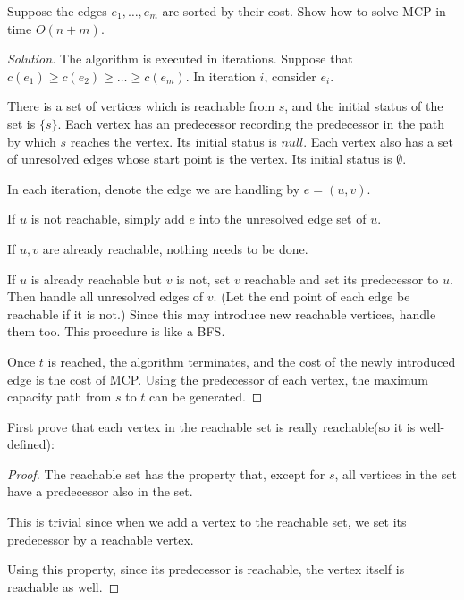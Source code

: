 


    \maketitle

    \begin{thm}{}{}
        Suppose the edges $e_1,\dots, e_m$ are sorted by their cost. Show how to solve MCP in time $O(n+m)$.
    \end{thm}
    \begin{proof}[Solution]
        The algorithm is executed in iterations. Suppose that $c(e_1)\geq c(e_2)\geq\dots\geq c(e_m)$. In iteration $i$, consider $e_i$. 

        There is a set of vertices which is reachable from $s$, and the initial status of the set is $\{s\}$. 
        Each vertex has an predecessor recording the predecessor in the path by which $s$ reaches the vertex. Its initial status is $null$. 
        Each vertex also has a set of unresolved edges whose start point is the vertex. Its initial status is $\emptyset$.

        In each iteration, denote the edge we are handling by $e=(u,v)$. 

        If $u$ is not reachable, simply add $e$ into the unresolved edge set of $u$. 

        If $u,v$ are already reachable, nothing needs to be done. 
       
        If $u$ is already reachable but $v$ is not, set $v$ reachable and set its predecessor to $u$. 
        Then handle all unresolved edges of $v$. (Let the end point of each edge be reachable if it is not.)
        Since this may introduce new reachable vertices, handle them too. This procedure is like a BFS. 

        Once $t$ is reached, the algorithm terminates, and the cost of the newly introduced edge is the cost of MCP. 
        Using the predecessor of each vertex, the maximum capacity path from $s$ to $t$ can be generated.
    \end{proof}

    \bigskip

    First prove that each vertex in the reachable set is really reachable(so it is well-defined): 
    \begin{proof}[Proof]
        The reachable set has the property that, except for $s$, all vertices in the set have a predecessor also in the set. 
        
        This is trivial since when we add a vertex to the reachable set, we set its predecessor by a reachable vertex. 

        Using this property, since its predecessor is reachable, the vertex itself is reachable as well. 
    \end{proof}

